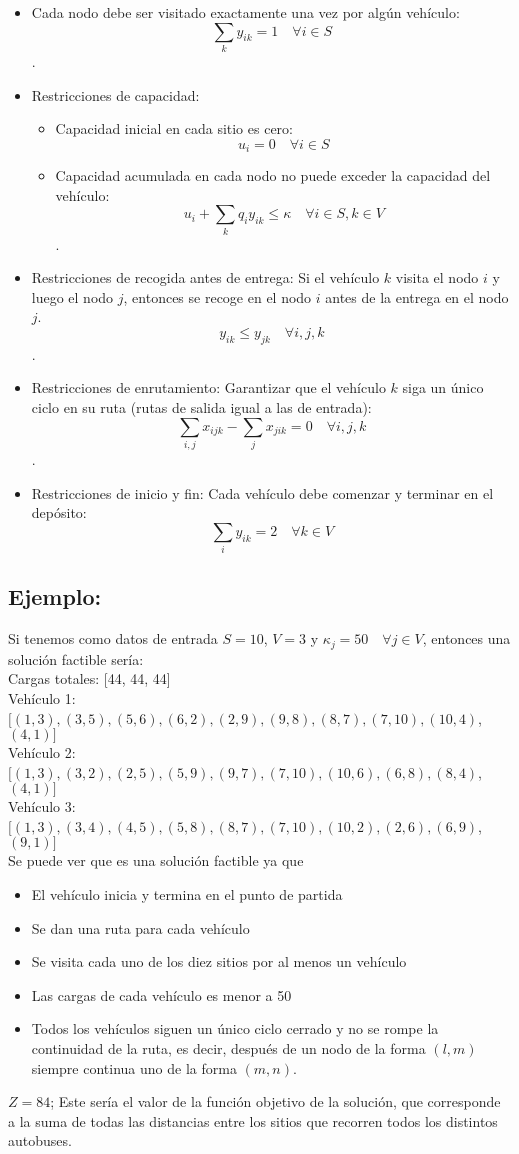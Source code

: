 \documentclass[11pt]{article}
\begin{document}
\begin{itemize}
	\item Cada nodo debe ser visitado exactamente una vez por algún vehículo:
	$$ \sum_{k} y_{ik} = 1\quad \forall i\in S$$.
	\item Restricciones de capacidad:
	\begin{itemize}
		\item Capacidad inicial en cada sitio es cero:
		$$u_i = 0 \quad \forall i \in S$$
		\item Capacidad acumulada en cada nodo no puede exceder la capacidad del vehículo:
		$$u_i + \sum_{k} q_i y_{ik} \leq \kappa \quad\forall i\in S, k \in V$$.
	\end{itemize}
	\item Restricciones de recogida antes de entrega:
	Si el vehículo $k$ visita el nodo $i$ y luego el nodo $j$, entonces se recoge en el nodo $i$ antes de la entrega en el nodo $j$.
	$$y_{ik} \leq y_{jk} \quad\forall i,j,k$$.
	\item Restricciones de enrutamiento:
	Garantizar que el vehículo $k$ siga un único ciclo en su ruta (rutas de salida igual a las de entrada):
	$$\sum_{i,j} x_{ijk} - \sum_{j} x_{jik} = 0 \quad\forall i,j,k$$.
	\item Restricciones de inicio y fin:
	Cada vehículo debe comenzar y terminar en el depósito:
	$$ \sum_{i} y_{ik} = 2 \quad\forall k\in V $$
	
\end{itemize}

\subsection*{Ejemplo:}
Si tenemos como datos de entrada $S=10$, $V=3$ y $\kappa_j = 50\quad \forall j\in V$, entonces una solución factible sería:\\

\noindent Cargas totales: [44, 44, 44]\\
Vehículo 1: $[(1,3),(3,5),(5,6),(6,2),(2,9),(9,8),(8,7),(7,10),(10,4)$, $(4,1)]$\\
Vehículo 2: $[(1,3),(3,2),(2,5),(5,9),(9,7),(7,10),(10,6),(6,8),(8,4)$, $(4,1)]$\\
Vehículo 3: $[(1,3),(3,4),(4,5),(5,8),(8,7),(7,10),(10,2),(2,6),(6,9)$, $(9,1)]$\\

Se puede ver que es una solución factible ya que
\begin{itemize}
	\item El vehículo inicia y termina en el punto de partida
	\item Se dan una ruta para cada vehículo
	\item Se visita cada uno de los diez sitios por al menos un vehículo
	\item Las cargas de cada vehículo es menor a 50
	\item Todos los vehículos siguen un único ciclo cerrado y no se rompe la continuidad de la ruta, es decir, después de un nodo de la forma $(l,m)$ siempre continua uno de la forma $(m,n)$.
\end{itemize}

\noindent\colorbox{wsdred!20}{$Z = 84$}; Este sería el valor de la función objetivo de la solución, que corresponde a la suma de todas las distancias entre los sitios que recorren todos los distintos autobuses.
\end{document}
